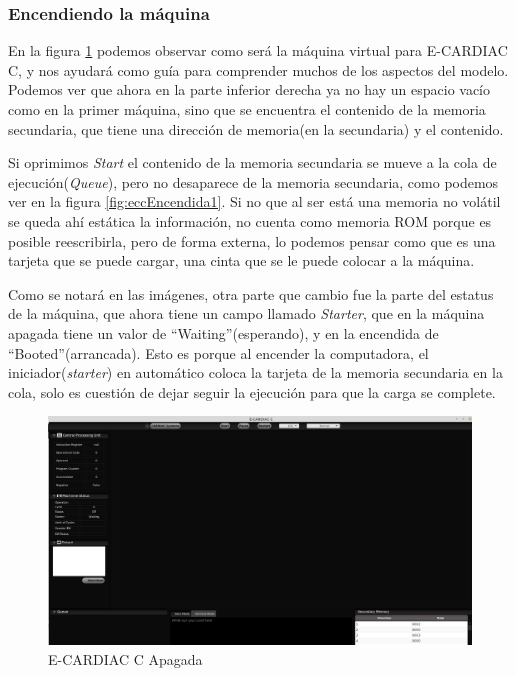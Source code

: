 \documentclass[letterpaper,12pt,oneside]{book}
\begin{document}
		\subsubsection{Encendiendo la máquina}
		
		En la figura \ref{fig:eccApagada} podemos observar  como será la máquina virtual para E-CARDIAC C, y nos ayudará como guía para comprender muchos
		de los aspectos del modelo. Podemos ver que ahora en la parte inferior derecha ya no hay un espacio vacío como en la primer máquina, sino que se encuentra
		el contenido de la memoria secundaria, que tiene una dirección de memoria(en la secundaria) y el contenido.
  
        Si oprimimos \textit{Start}
		el contenido de la memoria secundaria se mueve a la cola de ejecución(\textit{Queue}), pero no desaparece de la memoria secundaria, como podemos
		ver en la figura \ref{fig:eccEncendida1}. Si no que al ser está una memoria no volátil se queda ahí estática la información, no cuenta como memoria ROM porque es posible
		reescribirla, pero de forma externa, lo podemos pensar como que es una tarjeta que se puede cargar, una cinta que se le puede colocar a la máquina.
  
        Como se notará en las imágenes, otra parte que cambio fue la parte del estatus de
		la máquina, que ahora tiene un campo llamado \textit{Starter}, que en la máquina apagada tiene un valor de ``Waiting''(esperando), y en la encendida de ``Booted''(arrancada). Esto
		es porque al encender la computadora, el iniciador(\textit{starter}) en automático coloca la tarjeta de la memoria secundaria en la cola, solo es cuestión de dejar seguir la ejecución
		para que la carga se complete.

		\begin{figure}[h]		
			\centering
			\includegraphics[scale=0.25]{media/CARDIACC/ECARDIACC_apagada.png}
			\caption{E-CARDIAC C Apagada}
			\label{fig:eccApagada}
		\end{figure}		
		
\end{document}
